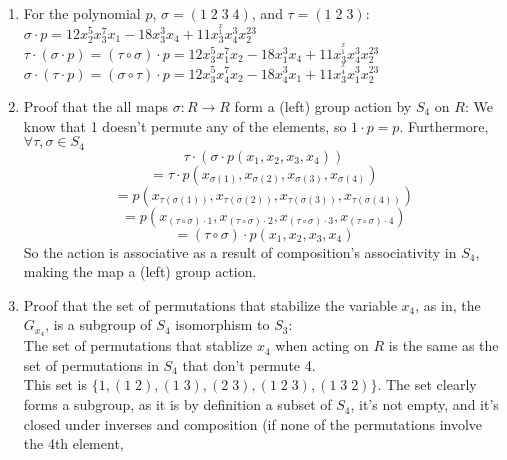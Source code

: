\documentclass[12pt]{article}
\begin{document}
    \begin{enumerate}[label=\textbf{\alph*.}]
        \item    
            For the polynomial $p$, $\sigma = (1\;2\;3\;4)$,
            and $\tau = (1\;2\;3)$: \\
            $\sigma \cdot p
            = 12x_2^5x_3^7x_1 - 18x_3^3x_4 + 11x_3^^x_1x_4^3x_2^{23}$ \\
            $\tau \cdot (\sigma \cdot p) = (\tau \circ \sigma) \cdot p
            = 12x_3^5x_1^7x_2 - 18x_1^3x_4 + 11x_3^^x_1x_4^3x_2^{23}$ \\
            $\sigma \cdot (\tau \cdot p) = (\sigma \circ \tau) \cdot p
            = 12x_3^5x_4^7x_2 - 18x_4^3x_1 + 11x_3^^x_4x_1^3x_2^{23}$ \\
        \item
            Proof that the all maps $\sigma: R \to R$
            form a (left) group action by $S_4$ on $R$:
            We know that 1 doesn't permute any of the elements,
            so $1 \cdot p = p$.
            Furthermore, $\forall \tau, \sigma \in S_4$
            \[\tau \cdot (\sigma \cdot p(x_1, x_2, x_3, x_4)) \]
            \[ = \tau \cdot p(x_{\sigma(1)}, x_{\sigma(2)},
            x_{\sigma(3)}, x_{\sigma(4)}) \]
            \[= p(x_{\tau(\sigma(1))}, x_{\tau(\sigma(2))},
            x_{\tau(\sigma(3))}, x_{\tau(\sigma(4))}) \]
            \[ = p(x_{(\tau \circ \sigma) \cdot 1},
            x_{(\tau \circ \sigma) \cdot 2},
            x_{(\tau \circ \sigma) \cdot 3},
            x_{(\tau \circ \sigma) \cdot 4}) \]
            \[= (\tau \circ \sigma) \cdot p(x_1, x_2, x_3, x_4) \]
            So the action is associative as a result of composition's
            associativity in $S_4$,
            making the map a (left) group action.
        \item
            Proof that the set of permutations that stabilize
            the variable $x_4$, as in, the $G_{x_4}$,
            is a subgroup of $S_4$ isomorphism to $S_3$: \\
            The set of permutations that stablize $x_4$ 
            when acting on $R$
            is the same as the set of permutations in $S_4$
            that don't permute 4. \\
            This set is $\{1, (1\;2), (1\;3), (2\;3), (1\;2\;3), (1\;3\;2)\}$.
            The set clearly forms a subgroup,
            as it is by definition a subset of $S_4$,
            it's not empty,
            and it's closed under inverses and composition
            (if none of the permutations involve the 4th element,

\end{enumerate}
\end{document}
